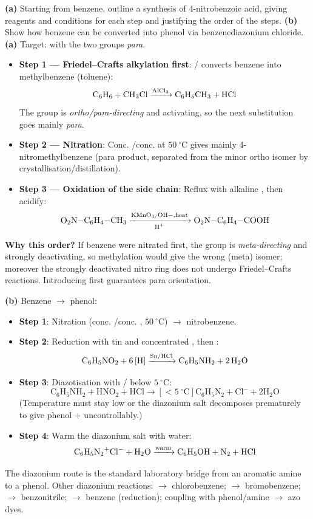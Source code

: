 \documentclass[11pt]{article}
\begin{document}
\begin{exoresolu}
\textbf{(a)} Starting from benzene, outline a synthesis of 4-nitrobenzoic acid, giving reagents and conditions for each step and justifying the order of the steps. \textbf{(b)} Show how benzene can be converted into phenol via benzenediazonium chloride.
\tcblower
\textbf{(a)} Target:  with the two groups \emph{para}.
\begin{itemize}
\item \textbf{Step 1 — Friedel–Crafts alkylation first}: / converts benzene into methylbenzene (toluene):
\[ \ce{C6H6 + CH3Cl ->[AlCl3] C6H5CH3 + HCl} \]
The  group is \emph{ortho/para-directing} and activating, so the next substitution goes mainly \emph{para}.
\item \textbf{Step 2 — Nitration}: Conc. /conc.  at $\SI{50}{\ensuremath{{}^{\circ}\mathrm{C}}}$ gives mainly 4-nitromethylbenzene (para product, separated from the minor ortho isomer by crystallisation/distillation).
\item \textbf{Step 3 — Oxidation of the side chain}: Reflux with alkaline , then acidify:
\[ \ce{O2N-C6H4-CH3 ->[KMnO4/OH-, heat][H+] O2N-C6H4-COOH} \]
\end{itemize}
\textbf{Why this order?} If benzene were nitrated first, the  group is \emph{meta-directing} and strongly deactivating, so methylation would give the wrong (meta) isomer; moreover the strongly deactivated nitro ring does not undergo Friedel–Crafts reactions. Introducing  first guarantees para orientation.

\textbf{(b)} Benzene $\rightarrow$ phenol:
\begin{itemize}
\item \textbf{Step 1}: Nitration (conc. /conc. , $\SI{50}{\ensuremath{{}^{\circ}\mathrm{C}}}$) $\rightarrow$ nitrobenzene.
\item \textbf{Step 2}: Reduction with tin and concentrated , then :
\[ \ce{C6H5NO2 + 6[H] ->[Sn/HCl] C6H5NH2 + 2H2O} \]
\item \textbf{Step 3}: Diazotisation with / below $\SI{5}{\ensuremath{{}^{\circ}\mathrm{C}}}$:
\[ \ensuremath{\mathrm{C_{6}H_{5}NH_{2} + HNO_{2} + HCl \rightarrow [<\SI{5}{\ensuremath{{}^{\circ}\mathrm{C}}}] C_{6}H_{5}N_{2}+Cl^{-} + 2H_{2}O}} \]
(Temperature must stay low or the diazonium salt decomposes prematurely to give phenol +  uncontrollably.)
\item \textbf{Step 4}: Warm the diazonium salt with water:
\[ \ce{C6H5N2+Cl- + H2O ->[warm] C6H5OH + N2 + HCl} \]
\end{itemize}
The diazonium route is the standard laboratory bridge from an aromatic amine to a phenol. Other diazonium reactions:  $\rightarrow$ chlorobenzene;  $\rightarrow$ bromobenzene;  $\rightarrow$ benzonitrile;  $\rightarrow$ benzene (reduction); coupling with phenol/amine $\rightarrow$ azo dyes.
\end{exoresolu}
\end{document}
